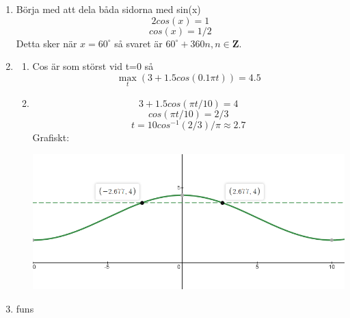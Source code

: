 \documentclass[a4paper,12pt]{article}
\begin{document}
\begin{enumerate}
      \item Börja med att dela båda sidorna med sin(x)
            $$2cos(x)=1$$
            $$cos(x)=1/2$$
            Detta sker när $x=60^\circ$ så svaret är $60^\circ + 360n, n \in \mathbf{Z}$.

      \item \begin{enumerate}
                  \item Cos är som störst vid t=0 så
                        $$\max_{t}(3+1.5cos(0.1\pi t))=4.5$$
                  \item
                        $$3+1.5cos(\pi t/10)=4$$
                        $$cos(\pi t/10)=2/3$$
                        $$t=10cos^{-1}(2/3)/\pi \approx 2.7$$
                        Grafiskt:

                        \includegraphics[scale=0.5]{Figur4.png}

            \end{enumerate}

      \item funs
\end{enumerate}
\end{document}
